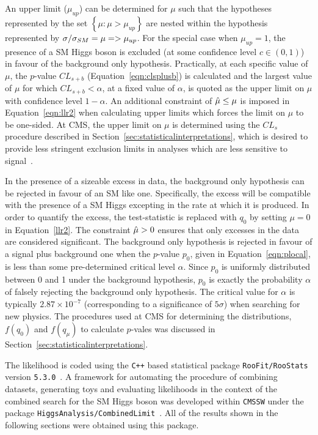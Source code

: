 An upper limit ($\mu_{up}$) can be determined for $\mu$ such that
the hypotheses represented by the set $\left\{ \mu:\mu>\mu_{up} \right\}$
are nested within the hypothesis represented by $\sigma/\sigma_{SM}=\mu=>\mu_{up}$.
For the special case when $\mu_{up}=1$, the presence of a SM Higgs boson is excluded
(at some confidence level $c\in(0,1)$) in favour of the background only hypothesis.
Practically, at each specific value of $\mu$, the $p$-value $CL_{s+b}$ 
(Equation~\ref{eqn:clsplusb}) 
is calculated and the largest value of $\mu$ for which $CL_{s+b}<\alpha$,
at a fixed value of $\alpha$, is quoted as the upper limit on $\mu$ with confidence level 
$1-\alpha$. An additional constraint of $\hat{\mu} \le \mu$ is imposed in Equation~\ref{eqn:llr2} 
when calculating upper limits which forces the limit on $\mu$ to be one-sided.
At CMS, the upper limit on $\mu$ is determined using the $CL_{s}$
procedure described in Section~\ref{sec:statisticalinterpretations}, which is
desired to provide less stringent exclusion limits in analyses which are less sensitive
to signal~\citep{cls}. 

In the presence of a sizeable excess in data, the background only hypothesis
can be rejected in favour of an SM like one. Specifically, the excess 
will be compatible with the presence of a SM Higgs excepting in the rate
at which it is produced. In order to quantify the excess, the test-statistic
is replaced with $q_{0}$ by setting $\mu=0$ in Equation~\ref{llr2}.
The constraint $\hat{\mu}>0$ ensures that only excesses in the data are considered significant.
The background only hypothesis is rejected in favour of a signal plus background one
when the $p$-value $p_{0}$, given in Equation~\ref{eqn:plocal},
is less than some pre-determined critical level $\alpha$.
Since $p_{0}$ is uniformly distributed between 0 and 1 under the background hypothesis,
$p_{0}$ is exactly the probability $\alpha$ of falsely rejecting the background only hypothesis.
The critical value for $\alpha$ is typically $2.87\times10^{-7}$ (corresponding 
to a significance of $5\sigma$) when searching for new physics.  
The procedures used at CMS for determining the distributions, $f(q_{0})$ and $f(q_{\mu})$
to calculate $p$-vales was discussed in Section~\ref{sec:statisticalinterpretations}.

The likelihood is coded using the \texttt{C++} based 
statistical package \texttt{RooFit/RooStats} version \texttt{5.3.0}~\citep{roofit}. 
A framework for automating the procedure of combining datasets, generating toys
and evaluating likelihoods in the context of the combined search for the SM Higgs boson
was developed within \texttt{CMSSW} 
under the package \texttt{HiggsAnalysis/CombinedLimit}~\citep{combinationstwiki}.
All of the results shown in the following sections were obtained using this package.


